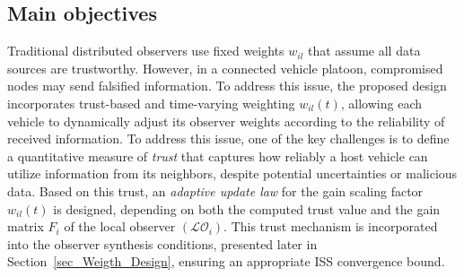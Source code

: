 \documentclass{ifacconf}
\def\eqref#1{(\ref{#1})}
\def\LO{\mathcal{LO}} %
\begin{document}
\subsection{Main objectives}
\vspace*{-0.3cm}
Traditional distributed observers use fixed weights $w_{i l}$ that assume all data sources are trustworthy. However, in a connected vehicle platoon, compromised nodes may send falsified information. To address this issue, the proposed design incorporates trust-based and time-varying weighting $w_{i l}(t)$, allowing each vehicle to dynamically adjust its observer weights according to the reliability of received information. To address this issue, one of the key challenges is to define a quantitative measure of \emph{trust} that captures how reliably a host vehicle can utilize information from its neighbors, despite potential uncertainties or malicious data. Based on this trust, an \emph{adaptive update law} for the gain scaling factor $w_{il}(t)$ is designed, depending on both the computed trust value and the gain matrix $F_i$ of the local observer $(\LO_i)$. This trust mechanism is incorporated into the observer synthesis conditions, presented later in Section~\ref{sec_Weigth_Design}, ensuring an appropriate ISS convergence bound.

\end{document}
